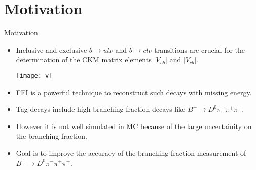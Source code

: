 \documentclass[12pt]{beamer}
\begin{document}

		
\section{Motivation}
	\begin{frame}[t]{Motivation}
		\begin{scriptsize}
			\begin{itemize}
				\item Inclusive and exclusive $b \to ul\nu$ and $b \to cl\nu$ transitions are crucial for the determination of the CKM matrix elements $\vert V_{ub} \vert$ and $\vert V_{cb} \vert$.\\
				\begin{center}
					\texttt{[image: v]}
				\end{center}
				\item FEI is a powerful technique to reconstruct such decays with missing energy.
				\item Tag decays include high branching fraction decays like $B^{-}\to D^{0} \pi^{-}\pi^{+}\pi^{-}$.
				\begin{center}
					\footnotesize
				\end{center}
			\item However it is not well simulated in MC because of the large uncertainity on the branching fraction.
			\item Goal is to improve the accuracy of the branching fraction measurement of $B^{-}\to D^{0} \pi^{-}\pi^{+}\pi^{-}$.
			\end{itemize}
		\end{scriptsize}
	\end{frame}
\end{document}
